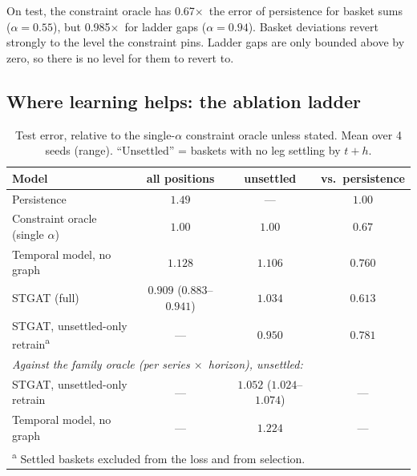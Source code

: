 \documentclass[11pt,a4paper]{article}
\newcommand{\x}{\ensuremath{\times}}
\begin{document}
On test, the constraint oracle has 0.67\x\ the error of persistence for basket
sums ($\alpha=0.55$), but 0.985\x\ for ladder gaps ($\alpha=0.94$). Basket
deviations revert strongly to the level the constraint pins. Ladder gaps are only
bounded above by zero, so there is no level for them to revert to.

\subsection{Where learning helps: the ablation ladder}\label{sec:learning}

\begin{table}[h]
\centering
\caption{Test error, relative to the single-$\alpha$ constraint oracle unless
stated. Mean over 4 seeds (range). ``Unsettled'' = baskets with no leg settling
by $t+h$.}
\label{tab:ladder}
\begin{tabular}{lccc}
\toprule
Model & all positions & unsettled & vs.\ persistence \\
\midrule
Persistence & $1.49$ & --- & $1.00$ \\
Constraint oracle (single $\alpha$) & $1.00$ & $1.00$ & $0.67$ \\
Temporal model, no graph & $1.128$ & $1.106$ & $0.760$ \\
STGAT (full) & $\bm{0.909}$ ($0.883$--$0.941$) & $1.034$ & $\bm{0.613}$ \\
STGAT, unsettled-only retrain\textsuperscript{a} & --- & $0.950$ & $0.781$ \\
\midrule
\multicolumn{4}{l}{\emph{Against the family oracle (per series \x\ horizon), unsettled:}} \\
STGAT, unsettled-only retrain & --- & $1.052$ ($1.024$--$1.074$) & --- \\
Temporal model, no graph & --- & $1.224$ & --- \\
\bottomrule
\multicolumn{4}{l}{\footnotesize \textsuperscript{a} Settled baskets excluded from the loss and from selection.}
\end{tabular}
\end{table}
\end{document}
